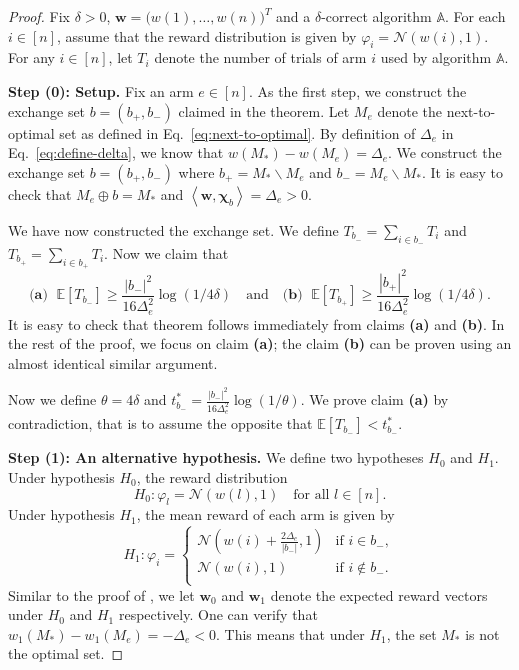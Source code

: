 \documentclass{article}
\newcommand{\Rew}{\varphi}
\newcommand{\E}{\mathbb E}
\newcommand{\del}{\backslash}
\newcommand{\inn}[1]{\left\langle #1 \right\rangle}
\renewcommand{\vec}[1]{\boldsymbol{#1}}
\begin{document}
\begin{proof}
Fix $\delta >0$, $\vec w =\big(w(1),\ldots,w(n)\big)^T$ and a $\delta$-correct algorithm $\mathbb A$.
For each $i\in [n]$, assume that the reward distribution is given by $\Rew_i=\mathcal N(w(i),1)$.
For any $i \in [n]$, let $T_i$ denote the  number of trials of arm $i$ used by algorithm $\mathbb A$.


\textbf{Step (0): Setup.} 
Fix an arm $e\in[n]$. 
As the first step, we construct the exchange set $b=(b_+,b_-)$ claimed in the theorem.
Let $M_e$ denote the next-to-optimal set as defined in Eq.~\eqref{eq:next-to-optimal}.
By definition of $\Delta_e$ in Eq.~\eqref{eq:define-delta}, we know that $w(M_*)-w(M_e)=\Delta_e$.
We construct the exchange set $b=(b_+, b_-)$ where $b_+ = M_*\del M_e$ and $b_- = M_e \del M_*$. 
It is easy to check that $M_e \oplus b = M_*$ and $\inn{\vec w, \vec\chi_b}=\Delta_e > 0$.

We have now constructed the exchange set. 
We define $T_{b_-}= \sum_{i\in b_-} T_i$ and $T_{b_+}=\sum_{i\in b_+} T_i$.
Now we claim that
\begin{equation}
\label{eq:lower-special-claim}
\textbf{(a) }\; \E\left[T_{b_-}\right] \ge \frac{|b_-|^2}{16\Delta_e^2} \log(1/4\delta)\quad\text{and}\quad\textbf{(b) }\; \E\left[T_{b_+}\right] \ge \frac{|b_+|^2}{16\Delta_e^2} \log(1/4\delta).
\end{equation}
It is easy to check that theorem follows immediately from  claims \textbf{(a)} and \textbf{(b)}.
In the rest of the proof, we focus on claim \textbf{(a)}; the claim \textbf{(b)} can be
	 proven using an almost identical similar argument.

Now we define $\theta = 4\delta$ and $t_{b_-}^* = \frac{|b_-|^2}{16\Delta_e^2} \log(1/\theta)$. 
We prove claim \textbf{(a)} by contradiction, that is to assume the opposite that $\E[T_{b_-}] < t_{b_-}^*$.

\textbf{Step (1): An alternative hypothesis.} 
We define two hypotheses $H_0$ and $H_1$.
Under hypothesis $H_0$, the reward distribution 
$$
H_0: \Rew_l = \mathcal N(w(l),1) \quad \text{for all } l \in [n].
$$
Under hypothesis $H_1$, the mean reward of each arm is given by 
$$
H_1: \Rew_i = \begin{cases}
	\mathcal N\left(w(i)+\frac{2\Delta_e}{|b_-|},1\right) & \text{if } i\in b_-,\\
	\mathcal N(w(i), 1) & \text{if } i \not\in b_-.\\
\end{cases}
$$
Similar to the proof of , we let $\vec w_0$ and $\vec w_1$ denote the expected reward vectors under $H_0$ and $H_1$ respectively.
One can verify that $w_1(M_*)-w_1(M_e) = -\Delta_e < 0$.
This means that under $H_1$, the set $M_*$ is not the optimal set.


\end{proof}
\end{document}

